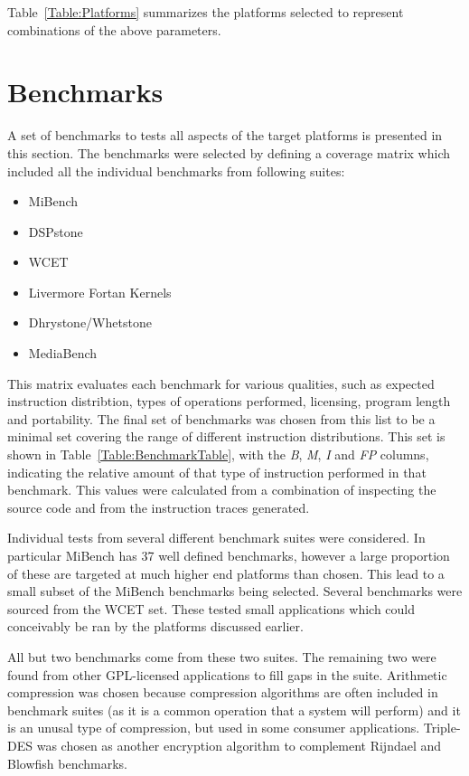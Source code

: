 \documentclass[twocolumn]{article}
\begin{document}
Table~\ref{Table:Platforms} summarizes the platforms selected to represent combinations of the above parameters.

\section{Benchmarks}

A set of benchmarks to tests all aspects of the target platforms is presented in this section. The benchmarks were selected by defining a coverage matrix which included all the individual benchmarks from following suites:
\begin{itemize}
	\setlength{\itemsep}{-0.35em}
	\item MiBench
	\item DSPstone
	\item WCET
	\item Livermore Fortan Kernels
	\item Dhrystone/Whetstone
	\item MediaBench
\end{itemize}

This matrix evaluates each benchmark for various qualities, such as expected instruction distribtion, types of operations performed, licensing, program length and portability. The final set of benchmarks was chosen from this list to be a minimal set covering the range of different instruction distributions. This set is shown in Table~\ref{Table:BenchmarkTable}, with the \textit{B}, \textit{M}, \textit{I} and \textit{FP} columns, indicating the relative amount of that type of instruction performed in that benchmark. This values were calculated from a combination of inspecting the source code and from the instruction traces generated.

Individual tests from several different benchmark suites were considered. In particular MiBench has 37 well defined benchmarks, however a large proportion of these are targeted at much higher end platforms than chosen. This lead to a small subset of the MiBench benchmarks being selected. Several benchmarks were sourced from the WCET set. These tested small applications which could conceivably be ran by the platforms discussed earlier.

All but two benchmarks come from these two suites. The remaining two were found from other GPL-licensed applications to fill gaps in the suite. Arithmetic compression\cite{Howard1992} was chosen because compression algorithms are often included in benchmark suites (as it is a common operation that a system will perform) and it is an unusal type of compression, but used in some consumer applications. Triple-DES was chosen as another encryption algorithm to complement Rijndael and Blowfish benchmarks.
\end{document}
